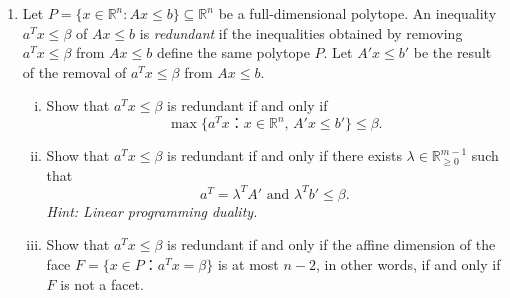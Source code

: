 \documentclass[11pt,a4paper]{article}
\begin{document}
\begin{enumerate}
    \item Let $P = \{ x ∈ ℝ^n : Ax ≤ b \} ⊆ ℝ^n$ be a full-dimensional polytope. An inequality $a^Tx ≤ β$ of $Ax ≤ b$ is \emph{redundant} if the inequalities obtained by  removing $a^Tx ≤ β$ from  $Ax ≤ b$ define the same polytope $P$. Let $A'x ≤b'$ be the result of the removal of  $a^Tx ≤ β$ from $Ax ≤ b$.
      \begin{enumerate}[i)] 
      \item Show that  $a^Tx ≤ β$ is redundant if and only if
        \begin{displaymath}
          \max\{ a^T x ： x ∈ ℝ^n, \, A'x ≤ b'\} ≤ β.
        \end{displaymath}
      \item Show that  $a^Tx ≤ β$ is redundant if and only if there exists $λ ∈ ℝ^{m-1}_{≥0}$ such that
        \begin{displaymath}
          a^T = λ^T A' \text{ and } λ^T b' ≤ β. 
        \end{displaymath}
        \emph{Hint: Linear programming duality.}
        \item Show that  $a^Tx ≤ β$ is redundant if and only if the affine dimension of the face $F = \{ x ∈ P ： a^Tx = β\}$ is at most $n-2$, in other words, if and only if  $F$  is not a facet. 
      \end{enumerate}
      
      

\end{enumerate}


%
%


 
\end{document}
